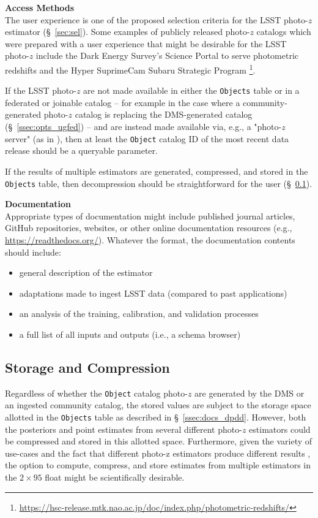 \documentclass[DM,lsstdraft,toc]{lsstdoc}
\begin{document}
{\bf Access Methods}\\
The user experience is one of the proposed selection criteria for the LSST photo-$z$ estimator (\S~\ref{sec:sel}). 
Some examples of publicly released photo-$z$ catalogs which were prepared with a user experience that might be desirable for the LSST photo-$z$ include the Dark Energy Survey's Science Portal to serve photometric redshifts \cite{2018A&C....25...58G} and the Hyper SuprimeCam Subaru Strategic Program \cite{2018PASJ...70S...9T}\footnote{\url{https://hsc-release.mtk.nao.ac.jp/doc/index.php/photometric-redshifts/}}.

If the LSST photo-$z$ are not made available in either the {\tt Objects} table or in a federated or joinable catalog -- for example in the case where a community-generated photo-$z$ catalog is replacing the DMS-generated catalog (\S~\ref{ssec:opts_ugfed}) -- and are instead made available via, e.g., a "photo-$z$ server" (as in \cite{2018A&C....25...58G}), then at least the {\tt Object} catalog ID of the most recent data release should be a queryable parameter.

If the results of multiple estimators are generated, compressed, and stored in the {\tt Objects} table, then decompression should be straightforward for the user (\S~\ref{ssec:dp_store}).

{\bf Documentation}\\
Appropriate types of documentation might include published journal articles, GitHub repositories, websites, or other online documentation resources (e.g., \url{https://readthedocs.org/}). Whatever the format, the documentation contents should include: 
\vspace{-15pt}
\begin{itemize}
\item general description of the estimator
\item adaptations made to ingest LSST data (compared to past applications)
\item an analysis of the training, calibration, and validation processes
\item a full list of all inputs and outputs (i.e., a schema browser)
\end{itemize}

\subsection{Storage and Compression}\label{ssec:dp_store}

Regardless of whether the {\tt Object} catalog photo-$z$ are generated by the DMS or an ingested community catalog, the stored values are subject to the storage space allotted in the {\tt Objects} table as described in \S~\ref{ssec:docs_dpdd}.
However, both the posteriors and point estimates from several different photo-$z$ estimators could be compressed and stored in this allotted space.
Furthermore, given the variety of use-cases and the fact that different photo-z estimators produce different results \citep{2020arXiv200103621S}, the option to compute, compress, and store estimates from multiple estimators in the $2\times95$ float might be scientifically desirable.
\end{document}
